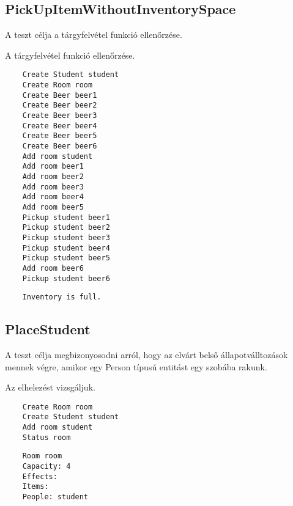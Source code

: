 \subsection{PickUpItemWithoutInventorySpace}
\begin{test-case-description}
    A teszt célja a tárgyfelvétel funkció ellenőrzése.
\end{test-case-description}
\begin{test-case-function}
    A tárgyfelvétel funkció ellenőrzése.
\end{test-case-function}
\begin{test-case-input}
    \begin{verbatim}
    Create Student student
    Create Room room
    Create Beer beer1
    Create Beer beer2
    Create Beer beer3
    Create Beer beer4
    Create Beer beer5
    Create Beer beer6
    Add room student
    Add room beer1
    Add room beer2
    Add room beer3
    Add room beer4
    Add room beer5
    Pickup student beer1
    Pickup student beer2
    Pickup student beer3
    Pickup student beer4
    Pickup student beer5
    Add room beer6
    Pickup student beer6
    \end{verbatim}
\end{test-case-input}
\begin{test-case-output}
    \begin{verbatim}
    Inventory is full.
    \end{verbatim}
\end{test-case-output}

\subsection{PlaceStudent}
\begin{test-case-description}
    A teszt célja megbizonyosodni arról, hogy az elvárt belső állapotválltozások mennek végre, amikor egy Person típusú entitást egy szobába rakunk.
\end{test-case-description}
\begin{test-case-function}
    Az elhelezést vizsgáljuk.
\end{test-case-function}
\begin{test-case-input}
    \begin{verbatim}
    Create Room room
    Create Student student
    Add room student
    Status room
    \end{verbatim}
\end{test-case-input}
\begin{test-case-output}
    \begin{verbatim}
    Room room
    Capacity: 4
    Effects:
    Items:
    People: student
    \end{verbatim}
\end{test-case-output}

